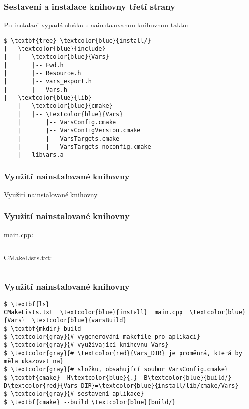 \begin{frame}[fragile]
\frametitle{Sestavení a instalace knihovny třetí strany}
Po instalaci vypadá složka s nainstalovanou knihovnou takto:
\begin{Verbatim}[commandchars=\\\{\}]
$ \textbf{tree} \textcolor{blue}{install/}
|-- \textcolor{blue}{include}
|   |-- \textcolor{blue}{Vars}
|       |-- Fwd.h
|       |-- Resource.h
|       |-- vars_export.h
|       |-- Vars.h
|-- \textcolor{blue}{lib}
    |-- \textcolor{blue}{cmake}
    |   |-- \textcolor{blue}{Vars}
    |       |-- VarsConfig.cmake
    |       |-- VarsConfigVersion.cmake
    |       |-- VarsTargets.cmake
    |       |-- VarsTargets-noconfig.cmake
    |-- libVars.a
\end{Verbatim}
\end{frame}

\begin{frame}
\frametitle{Využití nainstalované knihovny}
\begin{center}
\Huge {\color{white}Využití nainstalované knihovny}
\end{center}
\end{frame}

\begin{frame}[fragile]
\frametitle{Využití nainstalované knihovny}
main.cpp:
{\small \inputminted[frame=lines]{c++}{../examples/04-BuildingAndInstalling/main.cpp}}
CMakeLists.txt:
{\small \inputminted[frame=lines]{cmake}{../examples/04-BuildingAndInstalling/CMakeLists.txt}}
\end{frame}

\begin{frame}[fragile]
\frametitle{Využití nainstalované knihovny}
\begin{Verbatim}[commandchars=\\\{\}]
$ \textbf{ls}
CMakeLists.txt  \textcolor{blue}{install}  main.cpp  \textcolor{blue}{Vars}  \textcolor{blue}{varsBuild}
$ \textbf{mkdir} build
$ \textcolor{gray}{# vygenerování makefile pro aplikaci}
$ \textcolor{gray}{# využívající knihovnu Vars}
$ \textcolor{gray}{# \textcolor{red}{Vars_DIR} je proměnná, která by měla ukazovat na}
$ \textcolor{gray}{# složku, obsahující soubor VarsConfig.cmake}
$ \textbf{cmake} -H\textcolor{blue}{.} -B\textcolor{blue}{build/} -D\textcolor{red}{Vars_DIR}=\textcolor{blue}{install/lib/cmake/Vars}
$ \textcolor{gray}{# sestavení aplikace}
$ \textbf{cmake} --build \textcolor{blue}{build/}
\end{Verbatim}
\end{frame}

